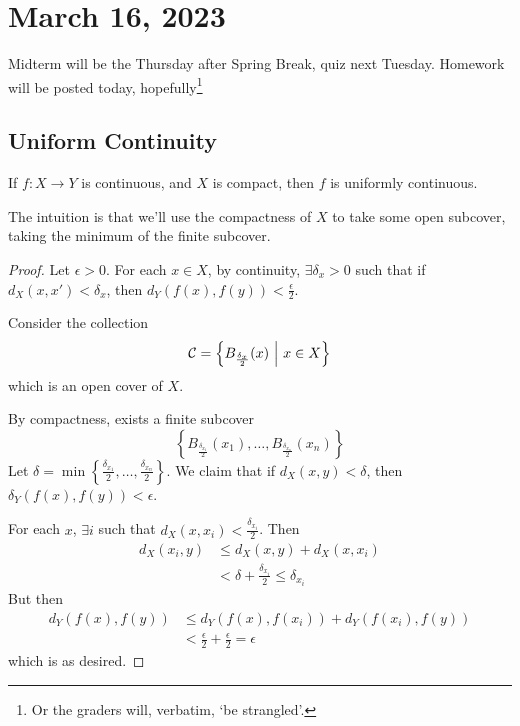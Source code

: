 \section{March 16, 2023}

Midterm will be the Thursday after Spring Break, quiz next Tuesday. Homework will be posted today, hopefully\footnote{Or the graders will, verbatim, `be strangled'.}

\subsection{Uniform Continuity}

\begin{theorem}
    If $f : X\to Y$ is continuous, and $X$ is compact, then $f$ is uniformly continuous.
\end{theorem}

The intuition is that we'll use the compactness of $X$ to take some open subcover, taking the minimum of the finite subcover.

\begin{proof}
    Let $\epsilon > 0$. For each $x\in X$, by continuity, $\exists \delta_x>0$ such that if $d_X(x, x') < \delta_x$, then $d_Y(f(x), f(y)) < \frac{\epsilon}{2}$.

    Consider the collection
    \[\mathcal C = \left\{ B_{\frac{\delta_x}{2}}(x)\ \middle|\  x\in X\right\}\]
    which is an open cover of $X$.

    By compactness, exists a finite subcover
    \[\left\{ B_{\frac{\delta_{x_1}}{2}}(x_1), \dots, B_{\frac{\delta_{x_n}}{2}}(x_n) \right\}\]
    Let $\delta = \min \left\{\frac{\delta_{x_1}}{2}, \dots, \frac{\delta_{x_n}}{2}\right\}$. We claim that if $d_X(x, y) < \delta$, then $\delta_Y(f(x), f(y)) < \epsilon$.

    For each $x$, $\exists i$ such that $d_X(x, x_i) < \frac{\delta_{x_i}}{2}$. Then
    \begin{align*}
        d_X(x_i, y) & \leq d_X(x, y) + d_X(x, x_i)                        \\
                    & < \delta + \frac{\delta_{x_i}}{2} \leq \delta_{x_i}
    \end{align*}
    But then
    \begin{align*}
        d_Y(f(x), f(y)) & \leq d_Y(f(x),f(x_i)) + d_Y(f(x_i), f(y))            \\
                        & < \frac{\epsilon}{2} + \frac{\epsilon}{2} = \epsilon
    \end{align*}
    which is as desired.
\end{proof}

